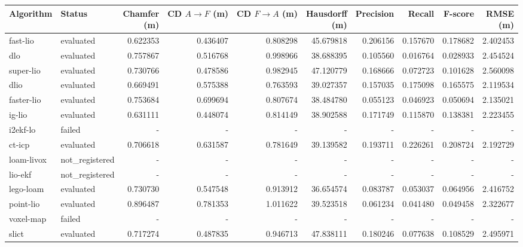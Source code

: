 \documentclass{article}
\begin{document}
\vspace*{\fill}

\begin{table}[htbp]
\centering
\small
\setlength{\tabcolsep}{3pt}
\begin{tabular}{llrrrrrrrr}
\hline
Algorithm & Status & \shortstack{Chamfer\\(m)} & \shortstack{CD $A \to F$\\(m)} & \shortstack{CD $F \to A$\\(m)} & \shortstack{Hausdorff\\(m)} & Precision & Recall & F-score & \shortstack{RMSE\\(m)} \\
\hline
fast-lio & evaluated & 0.622353 & 0.436407 & 0.808298 & 45.679818 & 0.206156 & 0.157670 & 0.178682 & 2.402453 \\
dlo & evaluated & 0.757867 & 0.516768 & 0.998966 & 38.688395 & 0.105560 & 0.016764 & 0.028933 & 2.454524 \\
super-lio & evaluated & 0.730766 & 0.478586 & 0.982945 & 47.120779 & 0.168666 & 0.072723 & 0.101628 & 2.560098 \\
dlio & evaluated & 0.669491 & 0.575388 & 0.763593 & 39.027357 & 0.157035 & 0.175098 & 0.165575 & 2.119534 \\
faster-lio & evaluated & 0.753684 & 0.699694 & 0.807674 & 38.484780 & 0.055123 & 0.046923 & 0.050694 & 2.135021 \\
ig-lio & evaluated & 0.631111 & 0.448074 & 0.814149 & 38.902588 & 0.171749 & 0.115870 & 0.138381 & 2.223455 \\
i2ekf-lo & failed & - & - & - & - & - & - & - & - \\
ct-icp & evaluated & 0.706618 & 0.631587 & 0.781649 & 39.139582 & 0.193711 & 0.226261 & 0.208724 & 2.192729 \\
loam-livox & not\_registered & - & - & - & - & - & - & - & - \\
lio-ekf & not\_registered & - & - & - & - & - & - & - & - \\
lego-loam & evaluated & 0.730730 & 0.547548 & 0.913912 & 36.654574 & 0.083787 & 0.053037 & 0.064956 & 2.416752 \\
point-lio & evaluated & 0.896487 & 0.781353 & 1.011622 & 39.523518 & 0.061234 & 0.041480 & 0.049458 & 2.322677 \\
voxel-map & failed & - & - & - & - & - & - & - & - \\
slict & evaluated & 0.717274 & 0.487835 & 0.946713 & 47.838111 & 0.180246 & 0.077638 & 0.108529 & 2.495971 \\

\end{tabular}
\end{table}
\end{document}
